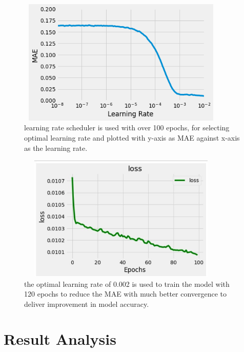 \documentclass[12 pt]{report}
\begin{document}

\begin{figure}[h!]
 \centering
 \includegraphics[width=10cm,height = 6cm,frame]{images/figure.png}
 \caption{ learning rate scheduler is used with over 100 epochs, for selecting optimal learning rate and plotted with y-axis as MAE against x-axis as the learning rate.}
 \label{fig: MAE vs Learning Rate}
\end{figure}

\begin{figure}[h!]
 \centering
 \includegraphics[width=10cm,height =6cm,frame]{images/loss.jpg}
 \caption{the optimal learning rate of 0.002 is used to train the model with 120 epochs to reduce the MAE with much better convergence to deliver improvement in model accuracy.}
 \label{fig:Loss vs Epoch}
\end{figure}

\newpage
\section{Result Analysis}
\end{document}
